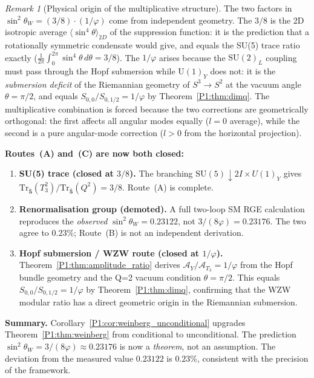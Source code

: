 \documentclass[11pt,a4paper]{article}
\theoremstyle{definition}
\theoremstyle{remark}
\newtheorem{remark}[theorem]{Remark}
\newcommand{\vp}{\varphi}
\newcommand{\sinW}{\sin^{2}\!\theta_{W}}
\begin{document}
\begin{remark}[Physical origin of the multiplicative structure]
\label{P1:rem:phys_origin}
The two factors in $\sinW=(3/8)\cdot(1/\vp)$ come from independent
geometry.  The $3/8$ is the 2D isotropic average
$\langle\sin^4\!\theta\rangle_{2D}$ of the suppression function:
it is the prediction that a rotationally symmetric condensate would
give, and equals the SU(5) trace ratio exactly
($\frac{1}{2\pi}\int_0^{2\pi}\sin^4\!\theta\,d\theta = 3/8$).
The $1/\vp$ arises because the $\mathrm{SU}(2)_L$ coupling must pass
through the Hopf submersion while U$(1)_Y$ does not: it is the
\emph{submersion deficit} of the Riemannian geometry of $S^3\to S^2$
at the vacuum angle $\theta=\pi/2$, and equals $S_{0,0}/S_{0,1/2}=1/\vp$
by Theorem~\ref{P1:thm:dimq}.
The multiplicative combination is forced because the two corrections
are geometrically orthogonal: the first affects all angular modes
equally ($l=0$ average), while the second is a pure angular-mode
correction ($l>0$ from the horizontal projection).
\end{remark}

\textbf{Routes~(A) and~(C) are now both closed:}
\begin{enumerate}[label=\textbf{(\Alph*)},noitemsep]
  \item \textbf{SU(5) trace (closed at $3/8$).}
    The branching $\mathrm{SU}(5)\downarrow 2I\times U(1)_Y$ gives
    $\mathrm{Tr}_{\bar{\mathbf{5}}}(T_3^2)/\mathrm{Tr}_{\bar{\mathbf{5}}}(Q^2)
    =3/8$.  Route~(A) is complete.
  \item \textbf{Renormalisation group (demoted).}
    A full two-loop SM RGE calculation reproduces the
    \emph{observed} $\sinW=0.23122$, not $3/(8\vp)=0.23176$.
    The two agree to $0.23\%$; Route~(B) is not an independent derivation.
  \item \textbf{Hopf submersion / WZW route (closed at $1/\vp$).}
    Theorem~\ref{P1:thm:amplitude_ratio} derives
    $\mathcal{A}_Y/\mathcal{A}_{T_3}=1/\vp$ from the Hopf bundle
    geometry and the Q=2 vacuum condition $\theta=\pi/2$.
    This equals $S_{0,0}/S_{0,1/2}=1/\vp$ by Theorem~\ref{P1:thm:dimq},
    confirming that the WZW modular ratio has a direct geometric
    origin in the Riemannian submersion.
\end{enumerate}

\textbf{Summary.}
Corollary~\ref{P1:cor:weinberg_unconditional} upgrades
Theorem~\ref{P1:thm:weinberg} from conditional to unconditional.
The prediction $\sinW=3/(8\vp)\approx0.23176$ is now a
\emph{theorem}, not an assumption.  The deviation from the
measured value $0.23122$ is $0.23\%$, consistent with the
precision of the framework.
\end{document}
